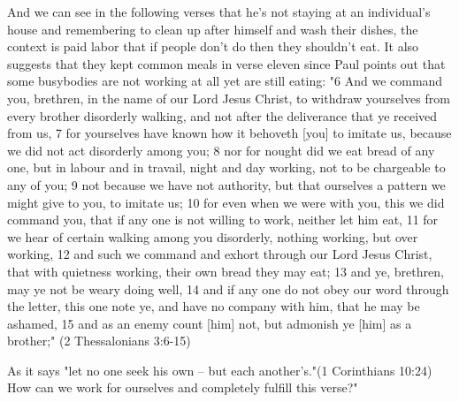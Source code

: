\documentclass[11pt]{article}
\begin{document}
And we can see in the following verses that he's not staying at an individual's house and remembering to clean up after himself and wash their dishes, the context is paid labor that if people don't do then they shouldn't eat. It also suggests that they kept common meals in verse eleven since Paul points out that some busybodies are not working at all yet are still eating:
"6 And we command you, brethren, in the name of our Lord Jesus Christ, to withdraw yourselves from every brother disorderly walking, and not after the deliverance that ye received from us,
7 for yourselves have known how it behoveth [you] to imitate us, because we did not act disorderly among you;
8 nor for nought did we eat bread of any one, but in labour and in travail, night and day working, not to be chargeable to any of you;
9 not because we have not authority, but that ourselves a pattern we might give to you, to imitate us;
10 for even when we were with you, this we did command you, that if any one is not willing to work, neither let him eat,
11 for we hear of certain walking among you disorderly, nothing working, but over working,
12 and such we command and exhort through our Lord Jesus Christ, that with quietness working, their own bread they may eat;
13 and ye, brethren, may ye not be weary doing well,
14 and if any one do not obey our word through the letter, this one note ye, and have no company with him, that he may be ashamed,
15 and as an enemy count [him] not, but admonish ye [him] as a brother;" (2 Thessalonians 3:6-15)

As it says "let no one seek his own -- but each another's."(1 Corinthians 10:24)
How can we work for ourselves and completely fulfill this verse?"
\end{document}
